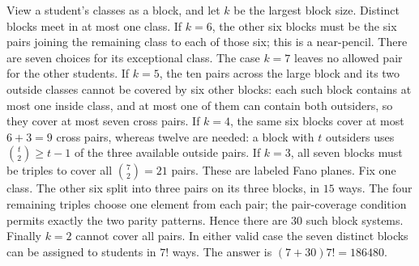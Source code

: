 View a student's classes as a block, and let $k$ be the largest block size. Distinct blocks meet in at most one class.
If $k=6$, the other six blocks must be the six pairs joining the remaining class to each of those six; this is a near-pencil. There are seven choices for its exceptional class.
The case $k=7$ leaves no allowed pair for the other students. If $k=5$, the ten pairs across the large block and its two outside classes cannot be covered by six other blocks: each such block contains at most one inside class, and at most one of them can contain both outsiders, so they cover at most seven cross pairs. If $k=4$, the same six blocks cover at most $6+3=9$ cross pairs, whereas twelve are needed: a block with $t$ outsiders uses $\binom t2\ge t-1$ of the three available outside pairs.
If $k=3$, all seven blocks must be triples to cover all $\binom72=21$ pairs. These are labeled Fano planes. Fix one class. The other six split into three pairs on its three blocks, in $15$ ways. The four remaining triples choose one element from each pair; the pair-coverage condition permits exactly the two parity patterns. Hence there are $30$ such block systems. Finally $k=2$ cannot cover all pairs.
In either valid case the seven distinct blocks can be assigned to students in $7!$ ways. The answer is $\boxed{(7+30)7!=186480}$.
